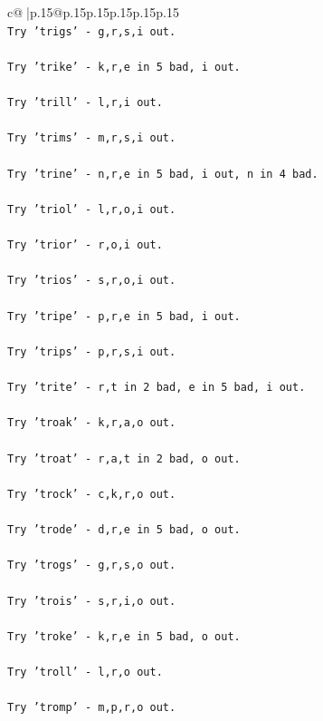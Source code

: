 \documentclass{article}
\begin{document}
{\begin{supertabular}{c@{$\;$}|p{.15\linewidth}@{}p{.15\linewidth}p{.15\linewidth}p{.15\linewidth}p{.15\linewidth}p{.15\linewidth}}
{{{\\ 
\texttt{Try 'trigs' {-} g,r,s,i out.} \\
\\ 
\texttt{Try 'trike' {-} k,r,e in 5 bad, i out.} \\
\\ 
\texttt{Try 'trill' {-} l,r,i out.} \\
\\ 
\texttt{Try 'trims' {-} m,r,s,i out.} \\
\\ 
\texttt{Try 'trine' {-} n,r,e in 5 bad, i out, n in 4 bad.} \\
\\ 
\texttt{Try 'triol' {-} l,r,o,i out.} \\
\\ 
\texttt{Try 'trior' {-} r,o,i out.} \\
\\ 
\texttt{Try 'trios' {-} s,r,o,i out.} \\
\\ 
\texttt{Try 'tripe' {-} p,r,e in 5 bad, i out.} \\
\\ 
\texttt{Try 'trips' {-} p,r,s,i out.} \\
\\ 
\texttt{Try 'trite' {-} r,t in 2 bad, e in 5 bad, i out.} \\
\\ 
\texttt{Try 'troak' {-} k,r,a,o out.} \\
\\ 
\texttt{Try 'troat' {-} r,a,t in 2 bad, o out.} \\
\\ 
\texttt{Try 'trock' {-} c,k,r,o out.} \\
\\ 
\texttt{Try 'trode' {-} d,r,e in 5 bad, o out.} \\
\\ 
\texttt{Try 'trogs' {-} g,r,s,o out.} \\
\\ 
\texttt{Try 'trois' {-} s,r,i,o out.} \\
\\ 
\texttt{Try 'troke' {-} k,r,e in 5 bad, o out.} \\
\\ 
\texttt{Try 'troll' {-} l,r,o out.} \\
\\ 
\texttt{Try 'tromp' {-} m,p,r,o out.} \\
\\ 
}}}
\end{supertabular}}
\end{document}

